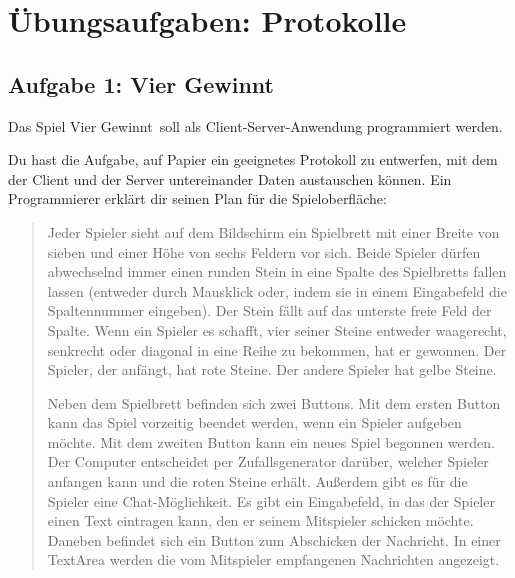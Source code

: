 \clearpage

\rehead[]{\textcolor{lightblue}{AvHG, Inf, My}}
\lohead[]{\textcolor{lightblue}{AvHG, Inf, My}}

\section{Übungsaufgaben: Protokolle}

\subsection{Aufgabe 1: Vier Gewinnt}

Das Spiel \glqq Vier Gewinnt\grqq\ soll als Client-Server-Anwendung programmiert
werden.

Du hast die Aufgabe, auf Papier ein geeignetes Protokoll zu entwerfen, mit dem
der Client und der Server untereinander Daten austauschen können. Ein
Programmierer erklärt dir seinen Plan für die Spieloberfläche:

\begin{quotation}
\noindent
Jeder Spieler sieht auf dem Bildschirm ein Spielbrett mit einer Breite von
sieben und einer Höhe von sechs Feldern vor sich. Beide Spieler dürfen
abwechselnd immer einen runden Stein in eine Spalte des Spielbretts fallen
lassen (entweder durch Mausklick oder, indem sie in einem Eingabefeld die
Spaltennummer eingeben). Der Stein fällt auf das unterste freie Feld der
Spalte. Wenn ein Spieler es schafft, vier seiner Steine entweder waagerecht,
senkrecht oder diagonal in eine Reihe zu bekommen, hat er gewonnen. Der
Spieler, der anfängt, hat rote Steine. Der andere Spieler hat gelbe Steine.

\noindent
Neben dem Spielbrett befinden sich zwei Buttons. Mit dem ersten Button kann das
Spiel vorzeitig beendet werden, wenn ein Spieler aufgeben möchte. Mit dem
zweiten Button kann ein neues Spiel begonnen werden. Der Computer entscheidet
per Zufallsgenerator darüber, welcher Spieler anfangen kann und die roten
Steine erhält. Außerdem gibt es für die Spieler eine Chat-Möglichkeit. Es gibt
ein Eingabefeld, in das der Spieler einen Text eintragen kann, den er seinem
Mitspieler schicken möchte. Daneben befindet sich ein Button zum Abschicken der
Nachricht. In einer TextArea werden die vom Mitspieler empfangenen
Nachrichten angezeigt.
\end{quotation}

